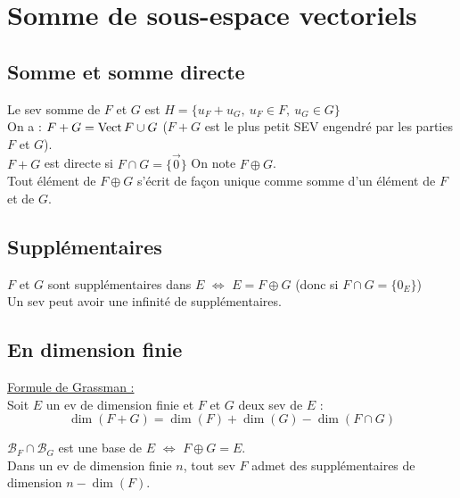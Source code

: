 \section{Somme de sous-espace vectoriels}\label{sec:somme-de-sous-espace-vectoriels}

    \subsection{Somme et somme directe}\label{subsec:somme-et-somme-directe}

        Le sev somme de $F$ et $G$ est $H = \{u_F + u_G,\ u_F \in F,\ u_G \in G\}$\\

        On a : $F + G = \operatorname{Vect}{F \cup G}$ ($F + G$ est le plus petit SEV engendré par les parties $F$ et $G$).\\
        $F + G$ est directe si $F \cap G = \{\vec 0 \}$ On note $F \oplus G$.\\
        Tout élément de $F \oplus G$ s'écrit de façon unique comme somme d'un élément de $F$ et de $G$.

    \subsection{Supplémentaires}\label{subsec:supplementaires}
        $F$ et $G$ sont supplémentaires dans $E$ $\iff$ $E = F \oplus G$ (donc si $F \cap G = \{0_E\}$)\\

        Un sev peut avoir une infinité de supplémentaires.

    \subsection{En dimension finie}\label{subsec:en-dimension-finie}

        \underline{Formule de Grassman :}\\
        Soit $E$ un ev de dimension finie et $F$ et $G$ deux sev de $E$ :
        \[\dim(F + G) = \dim(F) + \dim(G) - \dim(F \cap G)\]

        $\mathcal{B}_F \cap \mathcal{B}_G$ est une base de $E$ $\iff$ $F \oplus G = E$.\\
        Dans un ev de dimension finie $n$, tout sev $F$ admet des supplémentaires de dimension $n - \dim(F)$.
